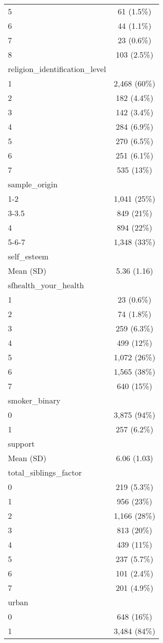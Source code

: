 \documentclass[
  singlecolumn,
  9pt]{article}
\begin{document}
\begin{table}
{\begin{longtable}[]{@{}lc@{}}
5 & 61 (1.5\%) \\
6 & 44 (1.1\%) \\
7 & 23 (0.6\%) \\
8 & 103 (2.5\%) \\
religion\_identification\_level & \\
1 & 2,468 (60\%) \\
2 & 182 (4.4\%) \\
3 & 142 (3.4\%) \\
4 & 284 (6.9\%) \\
5 & 270 (6.5\%) \\
6 & 251 (6.1\%) \\
7 & 535 (13\%) \\
sample\_origin & \\
1-2 & 1,041 (25\%) \\
3-3.5 & 849 (21\%) \\
4 & 894 (22\%) \\
5-6-7 & 1,348 (33\%) \\
self\_esteem & \\
Mean (SD) & 5.36 (1.16) \\
sfhealth\_your\_health & \\
1 & 23 (0.6\%) \\
2 & 74 (1.8\%) \\
3 & 259 (6.3\%) \\
4 & 499 (12\%) \\
5 & 1,072 (26\%) \\
6 & 1,565 (38\%) \\
7 & 640 (15\%) \\
smoker\_binary & \\
0 & 3,875 (94\%) \\
1 & 257 (6.2\%) \\
support & \\
Mean (SD) & 6.06 (1.03) \\
total\_siblings\_factor & \\
0 & 219 (5.3\%) \\
1 & 956 (23\%) \\
2 & 1,166 (28\%) \\
3 & 813 (20\%) \\
4 & 439 (11\%) \\
5 & 237 (5.7\%) \\
6 & 101 (2.4\%) \\
7 & 201 (4.9\%) \\
urban & \\
0 & 648 (16\%) \\
1 & 3,484 (84\%) \\
\end{longtable}

\addtocounter{table}{-1}

}

\end{table}%
\end{document}
